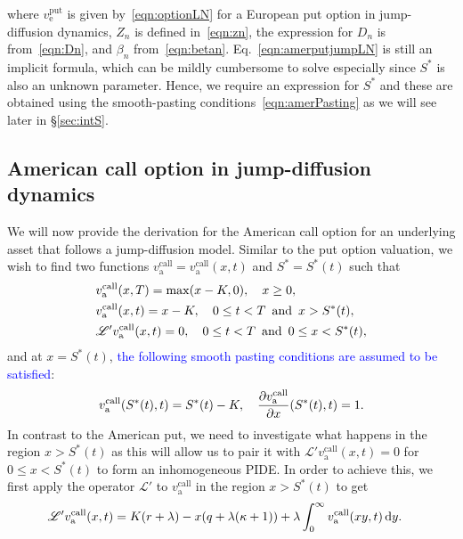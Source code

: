 		where $v_{\text{e}}^{\text{put}}$ is given by~\eqref{eqn:optionLN} for a European put option in jump-diffusion dynamics, $Z_n$ is defined in~\eqref{eqn:zn}, the expression for $D_n$ is from~\eqref{eqn:Dn}, and $\beta_n$ from~\eqref{eqn:betan}. Eq.~\eqref{eqn:amerputjumpLN} is still an implicit formula, which can be mildly cumbersome to solve especially since $S^*$ is also an unknown parameter. Hence, we require an expression for $S^*$ and these are obtained using the smooth-pasting conditions~\eqref{eqn:amerPasting} as we will see later in \S \ref{sec:intS}.
		
		\subsection{American call option in jump-diffusion dynamics}
		We will now provide the derivation for the American call option for an underlying asset that follows a jump-diffusion model. Similar to the put option valuation, we wish to find two functions $v_{\text{a}}^{\text{call}} = v_{\text{a}}^{\text{call}}(x,t)$ and $S^* = S^*(t)$ such that
		\begin{equation}
        \label{eqn:amercallPIDE}
        \begin{split}
            &v_{\text{a}}^{\text{call}}(x,T) = \max(x-K,0), \quad x \geq 0, \\
            &v_{\text{a}}^{\text{call}}(x,t) = x-K, \quad 0 \leq t < T \enskip \text{and} \enskip x > S^*(t), \\
            &\mathscr{L'}v_{\text{a}}^{\text{call}}(x,t) = 0, \quad 0 \leq t < T \enskip \text{and} \enskip 0 \leq x < S^*(t),
        \end{split}
    \end{equation}
    and at $x = S^*(t)$, \textcolor{blue}{the following smooth pasting conditions are assumed to be satisfied}:
    	\begin{equation}
    		\label{eqn:amercallPIDEsmc}
    		v_{\text{a}}^{\text{call}}(S^*(t),t) = S^*(t) - K, \quad \frac{\partial v_{\text{a}}^{\text{call}}}{\partial x}(S^*(t),t) = 1.
    	\end{equation}
	In contrast to the American put, we need to investigate what happens in the region $x > S^*(t)$ as this will allow us to pair it with $\mathscr{L'}v_{\text{a}}^{\text{call}}(x,t) = 0$ for $0 \leq x < S^*(t)$ to form an inhomogeneous PIDE. In order to achieve this, we first apply the operator $\mathscr{L'}$ to $v_{\text{a}}^{\text{call}}$ in the region $x > S^*(t)$ to get
		 \begin{align*}
            \mathscr L'v_{\text{a}}^{\text{call}}(x,t) &=  K(r+\lambda) - x(q + \lambda(\kappa+1)) + \lambda\int_0^\infty v_{\text{a}}^{\text{call}}(xy,t) \, \mathrm d y.
        \end{align*}

